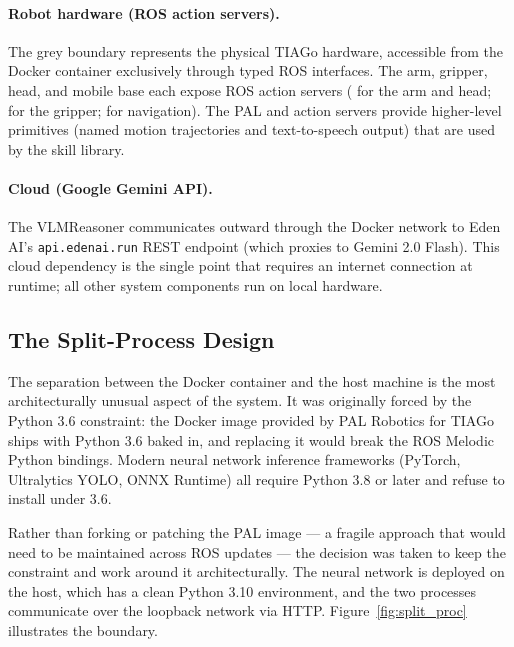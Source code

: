 \paragraph{Robot hardware (ROS action servers).}
The grey boundary represents the physical TIAGo hardware, accessible from the
Docker container exclusively through typed ROS interfaces.
The arm, gripper, head, and mobile base each expose ROS action servers
( for the arm and head;
 for the gripper;
 for navigation).
The PAL  and  action servers provide higher-level
primitives (named motion trajectories and text-to-speech output) that are used
by the skill library.

\paragraph{Cloud (Google Gemini API).}
The VLMReasoner communicates outward through the Docker network to
Eden AI's \texttt{api.edenai.run} REST endpoint (which proxies to Gemini 2.0 Flash).
This cloud dependency is the single point that requires an internet connection
at runtime; all other system components run on local hardware.

\subsection{The Split-Process Design}

The separation between the Docker container and the host machine is the most
architecturally unusual aspect of the system.
It was originally forced by the Python 3.6 constraint: the Docker image
provided by PAL Robotics for TIAGo ships with Python 3.6 baked in, and
replacing it would break the ROS Melodic Python bindings.
Modern neural network inference frameworks (PyTorch, Ultralytics YOLO,
ONNX Runtime) all require Python 3.8 or later and refuse to install
under 3.6.

Rather than forking or patching the PAL image --- a fragile approach that would
need to be maintained across ROS updates --- the decision was taken to keep the
constraint and work around it architecturally.
The neural network is deployed on the host, which has a clean Python 3.10
environment, and the two processes communicate over the loopback network via HTTP.
Figure~\ref{fig:split_proc} illustrates the boundary.

